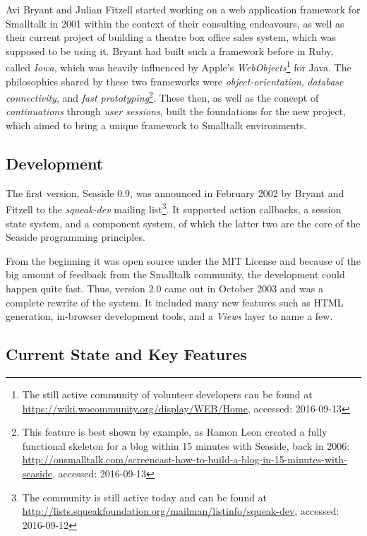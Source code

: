 \documentclass[a4paper,12pt,pagesize,headsepline,titlepage]{scrartcl}
\begin{document}
Avi Bryant and Julian Fitzell started working on a web application framework for Smalltalk in 2001 within the context of their consulting endeavours, as well as their current project of building a theatre box office sales system, which was supposed to be using it. Bryant had built such a framework before in Ruby, called \emph{Iowa}, which was heavily influenced by Apple's \emph{Web\-Objects}\footnote{The still active community of volunteer developers can be found at \url{https://wiki.wocommunity.org/display/WEB/Home}, accessed: 2016-09-13} for Java. The philosophies shared by these two frameworks were \emph{object-orientation}, \emph{database connectivity}, and \emph{fast prototyping}\footnote{This feature is best shown by example, as Ramon Leon created a fully functional skeleton for a blog within 15 minutes with Seaside, back in 2006: \url{http://onsmalltalk.com/screencast-how-to-build-a-blog-in-15-minutes-with-seaside}, accessed: 2016-09-13}. These then, as well as the concept of \emph{continuations} through \emph{user sessions}, built the foundations for the new project, which aimed to bring a unique framework to Smalltalk environments.


\subsection{Development}
\label{sec:dev} 

The first version, Seaside 0.9, was announced in February 2002 by Bryant and Fitzell to the \emph{squeak-dev} mailing list\footnote{The community is still active today and can be found at \url{http://lists.squeakfoundation.org/mailman/listinfo/squeak-dev}, accessed: 2016-09-12}. It supported action callbacks, a session state system, and a component system, of which the latter two are the core of the Seaside programming principles.

From the beginning it was open source under the MIT License and because of the big amount of feedback from the Smalltalk community, the development could happen quite fast. Thus, version 2.0 came out in October 2003 and was a complete rewrite of the system. It included many new features such as HTML generation, in-browser development tools, and a \emph{Views} layer to name a few. \cite{Fitzl}


\subsection{Current State and Key Features}
\label{sec:current} 
\end{document}
